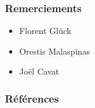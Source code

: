 \documentclass[10pt]{beamer}
\begin{document}
\begin{frame}
    \frametitle{Remerciements}
    \begin{itemize}
        \item Florent Glück
        \item Orestis Malaspinas
        \item Joël Cavat
    \end{itemize}
\end{frame}

\begin{frame}[allowframebreaks]
    \frametitle{Références}
    \fontsize{6pt}{6}\selectfont
	
	
\end{frame}
\end{document}
